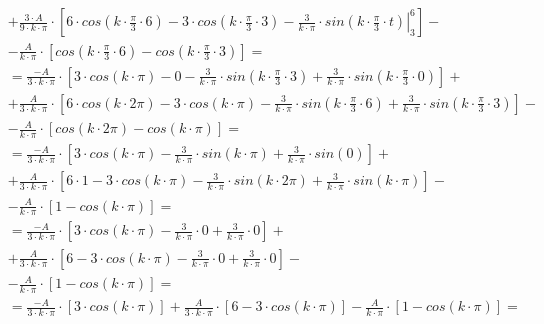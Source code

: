 \begin{task}
\begin{align*}
&+\frac{3 \cdot A}{9 \cdot k \cdot \pi} \cdot \left[ 6 \cdot cos\left( k \cdot \frac{\pi}{3} \cdot 6\right) -  3 \cdot cos\left( k \cdot \frac{\pi}{3} \cdot 3\right)
- \left. \frac{3}{k\cdot \pi}\cdot sin\left( k \cdot \frac{\pi}{3} \cdot t\right) \right|_{3}^{6}\right]-\\
&- \frac{A}{k\cdot \pi} \cdot \left[cos\left( k \cdot \frac{\pi}{3} \cdot 6\right) - cos\left( k \cdot \frac{\pi}{3} \cdot 3\right)\right]=\\
&=\frac{-A}{3 \cdot k \cdot \pi} \cdot \left[ 3 \cdot cos\left( k \cdot \pi\right) -  0 
- \frac{3}{k\cdot \pi}\cdot sin\left( k \cdot \frac{\pi}{3} \cdot 3\right) +  \frac{3}{k\cdot \pi}\cdot sin\left( k \cdot \frac{\pi}{3} \cdot 0\right)\right]+\\
&+\frac{A}{3 \cdot k \cdot \pi} \cdot \left[ 6 \cdot cos\left( k \cdot 2 \pi \right) -  3 \cdot cos\left( k \cdot \pi \right) - \frac{3}{k\cdot \pi}\cdot sin\left( k \cdot \frac{\pi}{3} \cdot 6\right) + \frac{3}{k\cdot \pi}\cdot sin\left( k \cdot \frac{\pi}{3} \cdot 3\right)\right]-\\
&- \frac{A}{k\cdot \pi} \cdot \left[cos\left( k \cdot 2\pi\right) - cos\left( k \cdot \pi \right)\right]=\\
&=\frac{-A}{3 \cdot k \cdot \pi} \cdot \left[ 3 \cdot cos\left( k \cdot \pi\right) - \frac{3}{k\cdot \pi}\cdot sin\left( k \cdot \pi\right) +  \frac{3}{k\cdot \pi}\cdot sin\left(0\right)\right]+\\
&+\frac{A}{3 \cdot k \cdot \pi} \cdot \left[ 6 \cdot 1 -  3 \cdot cos\left( k \cdot \pi\right) - \frac{3}{k\cdot \pi}\cdot sin\left( k \cdot 2 \pi \right) + \frac{3}{k\cdot \pi}\cdot sin\left( k \cdot \pi\right)\right]-\\
&- \frac{A}{k\cdot \pi} \cdot \left[1 - cos\left( k \cdot \pi\right)\right]=\\
&=\frac{-A}{3 \cdot k \cdot \pi} \cdot \left[ 3 \cdot cos\left( k \cdot \pi\right) - \frac{3}{k\cdot \pi}\cdot 0 +  \frac{3}{k\cdot \pi}\cdot 0\right]+\\
&+\frac{A}{3 \cdot k \cdot \pi} \cdot \left[ 6 -  3 \cdot cos\left( k \cdot \pi\right) - \frac{3}{k\cdot \pi}\cdot 0 + \frac{3}{k\cdot \pi}\cdot 0\right]-\\
&- \frac{A}{k\cdot \pi} \cdot \left[1 - cos\left( k \cdot \pi\right)\right]=\\
&=\frac{-A}{3 \cdot k \cdot \pi} \cdot \left[ 3 \cdot cos\left( k \cdot \pi\right)\right]+\frac{A}{3 \cdot k \cdot \pi} \cdot \left[ 6 -  3 \cdot cos\left( k \cdot \pi\right)\right]-\frac{A}{k\cdot \pi} \cdot \left[1 - cos\left( k \cdot \pi\right)\right]=\\

\end{align*}
\end{task}
